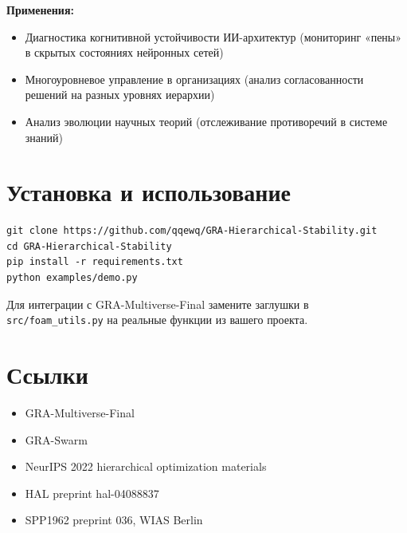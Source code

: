 \documentclass[11pt,a4paper]{article}
\begin{document}
\textbf{Применения:}
\begin{itemize}
    \item Диагностика когнитивной устойчивости ИИ-архитектур (мониторинг «пены» в скрытых состояниях нейронных сетей)
    \item Многоуровневое управление в организациях (анализ согласованности решений на разных уровнях иерархии)
    \item Анализ эволюции научных теорий (отслеживание противоречий в системе знаний)
\end{itemize}

\section{Установка и использование}

\begin{verbatim}
git clone https://github.com/qqewq/GRA-Hierarchical-Stability.git
cd GRA-Hierarchical-Stability
pip install -r requirements.txt
python examples/demo.py
\end{verbatim}

Для интеграции с GRA-Multiverse-Final замените заглушки в \texttt{src/foam\_utils.py} на реальные функции из вашего проекта.

\section{Ссылки}

\begin{itemize}
    \item GRA-Multiverse-Final
    \item GRA-Swarm
    \item NeurIPS 2022 hierarchical optimization materials
    \item HAL preprint hal-04088837
    \item SPP1962 preprint 036, WIAS Berlin
\end{itemize}
\end{document}
